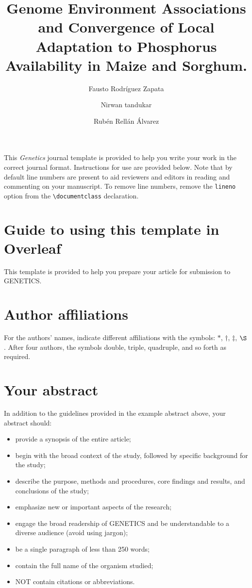 \documentclass[9pt,twocolumn,twoside,lineno]{gsajnl}
\title{Genome Environment Associations and Convergence of Local Adaptation to Phosphorus Availability in Maize and Sorghum.}
\author[1,$\dagger$]{Fausto Rodríguez Zapata}
\author[1,$\dagger$]{Nirwan tandukar}
\author[1*]{Rubén Rellán Álvarez}
\affil[1]{North Carolina Sate University, Department of Molecular and Structural Biochemistry}
\affil[$\dagger$]{These authors contributed equally to this work.}
\begin{document}
\maketitle
\thispagestyle{firststyle}
\vspace{-13pt}%

\lettrine[lines=2]{\color{color2}T}{}his \textit{Genetics} journal template is provided to help you write your work in the correct journal format. Instructions for use are provided below. Note that by default line numbers are present to aid reviewers and editors in reading and commenting on your manuscript. To remove line numbers, remove the \texttt{lineno} option from the \verb|\documentclass| declaration.


\section{Guide to using this template in Overleaf}

This template is provided to help you prepare your article for submission to GENETICS.

\section{Author affiliations}

For the authors' names, indicate different affiliations with the symbols: $\ast$, $\dagger$, $\ddagger$, $\S$. After four authors, the symbols double, triple, quadruple, and so forth as required.

\section{Your abstract}

In addition to the guidelines provided in the example abstract above, your abstract should:

\begin{itemize}
\item provide a synopsis of the entire article;
\item begin with the broad context of the study, followed by specific background for the study;
\item describe the purpose, methods and procedures, core findings and results, and conclusions of the study;
\item emphasize new or important aspects of the research;
\item engage the broad readership of GENETICS and be understandable to a diverse audience (avoid using jargon);
\item be a single paragraph of less than 250 words;
\item contain the full name of the organism studied;
\item NOT contain citations or abbreviations.
\end{itemize}
\end{document}
